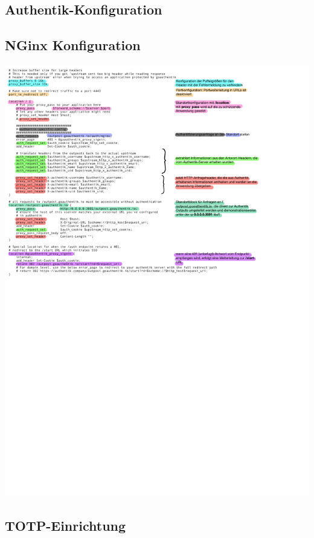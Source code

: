 \subsection{Authentik-Konfiguration}
\label{app:AuthentikConfig}
% 

\subsection{NGinx Konfiguration}
\label{app:CustomNGinxConfig}
\includegraphics{Anhang/Custom_NGinx_Configuration.pdf}

\subsection{TOTP-Einrichtung}
\label{sec:TOTPConfig}


